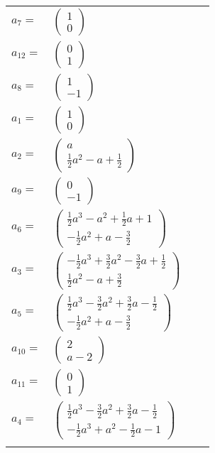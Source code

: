 \documentclass[1p]{elsarticle_modified}
\theoremstyle{definition}
\begin{document}
\begin{tabular}{m{7pt} m{180pt} m{7pt} m{180pt} }
\flushright $a_{7}=$&$\begin{pmatrix}1\\0\end{pmatrix}$ \\
\flushright $a_{12}=$&$\begin{pmatrix}0\\1\end{pmatrix}$ \\
\flushright $a_{8}=$&$\begin{pmatrix}1\\-1\end{pmatrix}$ \\
\flushright $a_{1}=$&$\begin{pmatrix}1\\0\end{pmatrix}$ \\
\flushright $a_{2}=$&$\begin{pmatrix}a\\\frac{1}{2} a^2- a+\frac{1}{2}\end{pmatrix}$ \\
\flushright $a_{9}=$&$\begin{pmatrix}0\\-1\end{pmatrix}$ \\
\flushright $a_{6}=$&$\begin{pmatrix}\frac{1}{2} a^3- a^2+\frac{1}{2} a+1\\-\frac{1}{2} a^2+a-\frac{3}{2}\end{pmatrix}$ \\
\flushright $a_{3}=$&$\begin{pmatrix}-\frac{1}{2} a^3+\frac{3}{2} a^2-\frac{3}{2} a+\frac{1}{2}\\\frac{1}{2} a^2- a+\frac{3}{2}\end{pmatrix}$ \\
\flushright $a_{5}=$&$\begin{pmatrix}\frac{1}{2} a^3-\frac{3}{2} a^2+\frac{3}{2} a-\frac{1}{2}\\-\frac{1}{2} a^2+a-\frac{3}{2}\end{pmatrix}$ \\
\flushright $a_{10}=$&$\begin{pmatrix}2\\a-2\end{pmatrix}$ \\
\flushright $a_{11}=$&$\begin{pmatrix}0\\1\end{pmatrix}$ \\
\flushright $a_{4}=$&$\begin{pmatrix}\frac{1}{2} a^3-\frac{3}{2} a^2+\frac{3}{2} a-\frac{1}{2}\\-\frac{1}{2} a^3+a^2-\frac{1}{2} a-1\end{pmatrix}$\\&\end{tabular}
\end{document}
